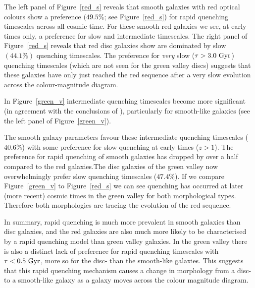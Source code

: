 \documentclass[useAMS,usenatbib]{mn2e}
\begin{document}
The left panel of Figure~\ref{red_s} reveals that smooth galaxies with red optical colours show a preference $(49.5\%$; see Figure~\ref{red_s}) for rapid quenching timescales across all cosmic time. For these smooth red galaxies we see, at early times only, a preference for slow and intermediate timescales. The right panel of Figure~\ref{red_s} reveals that red disc galaxies show are dominated by slow $(44.1\%)$ quenching timescales. The preference for \emph{very} slow ($\tau > 3.0 ~\rm{Gyr}$) quenching timescales (which are not seen for the green valley discs) suggests that these galaxies have only just reached the red sequence after a very slow evolution across the colour-magnitude diagram.

In Figure~\ref{green_v} intermediate quenching timescales become more significant (in agreement with the conclusions of \citealt{Gonc12}), particularly for smooth-like galaxies (see the left panel of Figure~\ref{green_v}).

The smooth galaxy parameters favour these intermediate quenching timescales ($40.6\%$) with some preference for slow quenching at  early times ($z > 1$). The preference for rapid quenching of smooth galaxies has dropped by over a half compared to the red galaxies.The disc galaxies of the green valley now overwhelmingly prefer slow quenching timescales ($47.4\%$). If we compare Figure~\ref{green_v} to Figure~\ref{red_s} we can see quenching has occurred at later (more recent) cosmic times in the green valley for both morphological types. Therefore both morphologies are tracing the evolution of the red sequence.

In summary, rapid quenching is much more prevalent in smooth galaxies than disc galaxies, and the red galaxies  are also much more likely to be characterised by a rapid quenching model than green valley galaxies. In the green valley there is also a distinct lack of preference for rapid quenching timescales with $\tau < 0.5~\rm{Gyr}$, more so for the disc- than the smooth-like galaxies. This suggests that this rapid quenching mechanism causes a change in morphology from a disc- to a smooth-like galaxy as a galaxy moves across the colour magnitude diagram.
\end{document}

